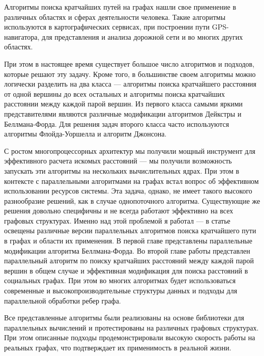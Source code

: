 \startprefacepage

Алгоритмы поиска кратчайших путей на графах нашли свое применение в различных областях и сферах деятельности человека. Такие алгоритмы используются в картографических сервисах, при построении пути GPS-навигатора, для представления и анализа дорожной сети и во многих других областях.
 
При этом в настоящее время существует большое число алгоритмов и подходов, которые решают эту задачу. Кроме того, в большинстве своем алгоритмы можно логически разделить на два класса --- алгоритмы поиска кратчайшего расстояния от одной вершины до всех остальных и алгоритмы поиска кратчайших расстоянии между каждой парой вершин. Из первого класса самыми яркими представителями являются различные модификации алгоритмов Дейкстры и Беллмана-Форда. Для решения задач второго класса часто используются алгоритмы Флойда-Уоршелла и алгоритм Джонсона. 

С ростом многопроцессорных архитектур мы получили мощный инструмент для эффективного расчета искомых расстояний --- мы получили возможность запускать эти алгоритмы на нескольких вычислительных ядрах. При этом в контексте с параллельными алгоритмами на графах встал вопрос об эффективном использовании ресурсов системы. Эта задача, однако, не имеет такого высокого разнообразие решений, как в случае однопоточного алгоритма. Существующие же решения довольно специфичны и не всегда работают эффективно на всех графовых структурах. Именно над этой проблемой я работал --- в статье освещены различные версии параллельных алгоритмов поиска кратчайшего пути в графах и области их применения. В первой главе представлены параллельные модификации алгоритма Беллмана-Форда. Во второй главе работы представлен параллельный алгоритм по поиску кратчайших расстояний между каждой парой вершин в общем случае и эффективная модификация для поиска расстояний в социальных графах. При этом во многих алгоритмах будет использоваться современные и высокопроизводительные структуры данных и подходы для параллельной обработки ребер графа.

Все представленные алгоритмы были реализованы на основе библиотеки для параллельных вычислений и протестированы на различных графовых структурах. При этом описанные подходы продемонстрировали высокую скорость работы на реальных графах, что подтверждает их применимость в реальной жизни.
\FloatBarrier
